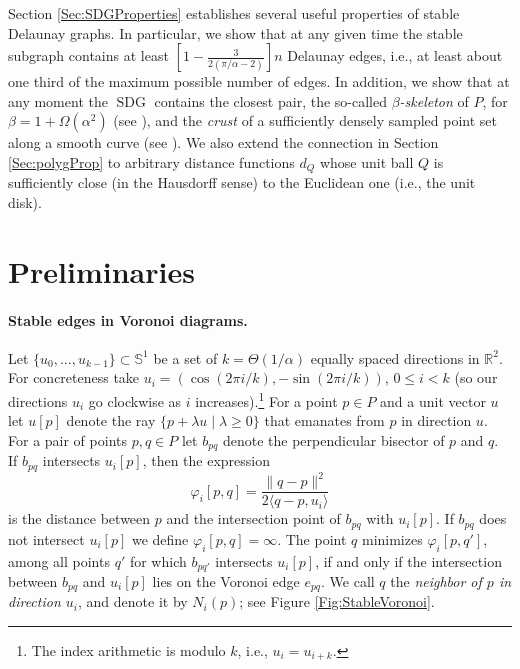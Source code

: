 \documentclass[letter,11pt]{article}
\newcommand{\seclab}[1]{\label{sec:#1}}
\def \reals{{\mathbb R}}
\def \sphere{{\mathbb S}}
\def\inprod#1#2{\langle #1, #2\rangle}
\def\bisect{b}
\def\Nbrs{N}
\def\distfn{\varphi}
\def\SDG{\mathop{\mathrm{SDG}}}
\begin{document}
Section \ref{Sec:SDGProperties} establishes several useful properties of stable Delaunay graphs. In particular, we show that at
any given time the stable subgraph contains at least $\left[1-\frac{3}{2(\pi/\alpha-2)}\right]n$ Delaunay
edges, i.e., at least about one third of the maximum possible number of edges. In addition, we 
show that at any moment the $\SDG$ contains the closest pair, the so-called 
\textit{$\beta$-skeleton} of $P$, for $\beta=1+\Omega(\alpha^2)$ (see \cite{Crusts,Skeletons}), and the \textit{crust} of a sufficiently densely sampled point set along a smooth curve (see \cite{Amenta,Crusts}). 
We also extend the connection in Section \ref{Sec:polygProp} to arbitrary distance functions $d_Q$ whose unit ball $Q$ is sufficiently close (in the Hausdorff sense) to the Euclidean one (i.e., the unit disk).


\section{Preliminaries}\label{sec:Prelim}
\seclab{sdg}\seclab{ddg}
\paragraph{Stable edges in Voronoi diagrams.}
Let $\{u_0, \ldots, u_{k-1}\} \subset \sphere^1$ be a set of 
$k=\Theta(1/\alpha)$ equally spaced directions in $\reals^2$. For 
concreteness take $u_i = (\cos
(2\pi i/k), -\sin (2\pi i/k))$, $0\le i < k$ (so our directions $u_i$ go clockwise as $i$ increases).\footnote{The index arithmetic is modulo $k$, i.e., $u_i=u_{i+k}$.} 
For a point $p\in P$ and a unit vector
$u$ let $u[p]$ denote the ray $\{p+\lambda u\mid \lambda \geq 0\}$ that
emanates from $p$ in direction $u$.  For a pair of points $p,q \in P$ 
let $\bisect_{pq}$ denote the perpendicular bisector of $p$ and $q$.
If $\bisect_{pq}$ intersects $u_i[p]$, then the expression
\begin{equation}\label{Eq:DirectDist}
\distfn_i[p,q]=\frac{\|q-p\|^2}{2\inprod{q-p}{u_i}}
\end{equation}
is the distance
between $p$ and the intersection point of $\bisect_{pq}$ with
$u_i[p]$.
If $\bisect_{pq}$ does not
intersect $u_i[p]$ we define $\distfn_i[p,q] = \infty$.
 The point $q$ minimizes $\distfn_i[p,q']$, among all points
$q'$ for which $\bisect_{pq'}$ intersects $u_i[p]$, if and only if the
intersection between $\bisect_{pq}$ and $u_i[p]$ lies on the Voronoi edge $e_{pq}$. We call $q$ the {\em neighbor of $p$ in direction $u_i$}, 
and denote it by $\Nbrs_i(p)$; see Figure \ref{Fig:StableVoronoi}.
\end{document}
